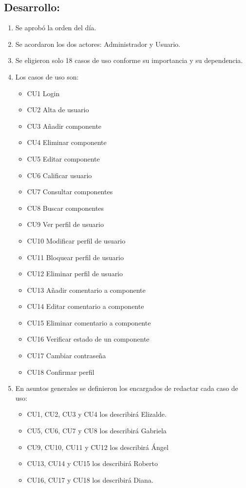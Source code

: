 \documentclass[12pt]{article}
\begin{document}
\subsection{Desarrollo:}
\begin{enumerate}
 	\item Se aprobó la orden del día.
	\item Se acordaron los dos actores: Administrador y Usuario.
	\item Se eligieron solo 18 casos de uso conforme su importancia y su dependencia.
	\item Los casos de uso son:
	\begin{itemize}
		\item  CU1 Login
		\item CU2 Alta de usuario
 		\item  CU3 Añadir componente
		\item CU4 Eliminar componente
 		\item  CU5 Editar componente
 		\item  CU6 Calificar usuario
		\item CU7 Consultar componentes
		\item CU8 Buscar componentes
		\item CU9 Ver perfil de usuario
		\item CU10 Modificar perfil de usuario
		\item CU11 Bloquear perfil de usuario
		\item CU12 Eliminar perfil de usuario
		\item CU13 Añadir comentario a componente
		\item CU14 Editar comentario a componente
		\item CU15 Eliminar comentario a componente
		\item CU16 Verificar estado de un componente
		\item CU17 Cambiar contraseña
		\item CU18 Confirmar perfil
	\end{itemize}
 	\item En asuntos generales se definieron los encargados de redactar cada caso de uso:
	\begin{itemize}
		\item  CU1, CU2, CU3 y CU4 los describirá Elizalde.
		\item CU5, CU6, CU7 y CU8 los describirá Gabriela
 		\item  CU9, CU10, CU11 y CU12 los describirá Ángel
		\item CU13, CU14 y CU15 los describirá Roberto
 		\item  CU16, CU17 y CU18 los describirá Diana.
	\end{itemize}
\end{enumerate}
\end{document}

